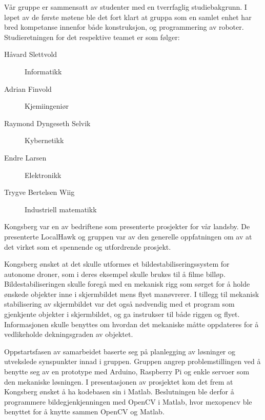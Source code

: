 Vår gruppe er sammensatt av studenter med en tverrfaglig studiebakgrunn. I løpet av de første møtene ble det fort klart at gruppa som en samlet enhet har bred kompetanse innenfor både konstruksjon, og programmering av roboter. Studieretningen for det respektive teamet er som følger:
%
\begin{description}
	\item[Håvard Slettvold] Informatikk
	\item[Adrian Finvold] Kjemiingeniør
	\item[Raymond Dyngeseth Selvik] Kybernetikk
	\item[Endre Larsen] Elektronikk
	\item[Trygve Bertelsen Wiig] Industriell matematikk
\end{description}
%
Kongsberg var en av bedriftene som presenterte prosjekter for vår landsby. De presenterte LocalHawk og gruppen var av den generelle oppfatningen om av at det virket som et spennende og utfordrende prosjekt. 

Kongsberg ønsket at det skulle utformes et bildestabiliseringssystem for autonome droner, som i deres eksempel skulle brukes til å filme billøp. Bildestabiliseringen skulle foregå med en mekanisk rigg som sørget for å holde ønskede objekter inne i skjermbildet mens flyet manøvrerer. I tillegg til mekanisk stabilisering av skjermbildet var det også nødvendig med et program som gjenkjente objekter i skjermbildet, og ga instrukser til både riggen og flyet. Informasjonen skulle benyttes om hvordan det mekaniske måtte oppdateres for å vedlikeholde dekningsgraden av objektet. 

Oppstartsfasen av samarbeidet baserte seg på planlegging av løsninger og utvekslede synspunkter innad i gruppen. Gruppen angrep problemstillingen ved å benytte seg av en prototype med Arduino, Raspberry Pi og enkle servoer som den mekaniske løsningen. I presentasjonen av prosjektet kom det frem at Kongsberg ønsket å ha kodebasen sin i Matlab. Beslutningen ble derfor å programmere bildegjenkjenningen med OpenCV i Matlab, hvor mexopencv ble benyttet for å knytte sammen OpenCV og Matlab.